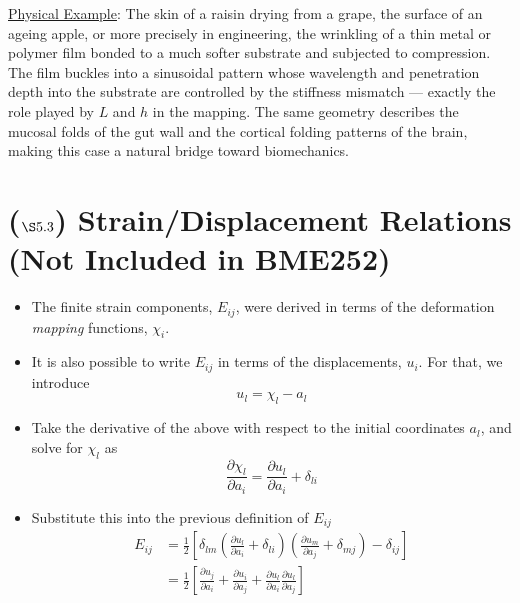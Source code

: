 \documentclass[11pt]{article}
\begin{document}
\uline{Physical Example}: The skin of a raisin drying from a grape, the surface of an ageing apple, or more precisely in engineering, the wrinkling of a thin metal or polymer film bonded to a much softer substrate and subjected to compression. The film buckles into a sinusoidal pattern whose wavelength and penetration depth into the substrate are controlled by the stiffness mismatch — exactly the role played by \(L\) and \(h\) in the mapping. The same geometry describes the mucosal folds of the gut wall and the cortical folding patterns of the brain, making this case a natural bridge toward biomechanics.
\section*{(\(\S5.3\)) Strain/Displacement Relations (Not Included in BME252)}
\label{sec:org86b48c2}
\begin{itemize}
\item The finite strain components, \(E_{ij}\), were derived in terms of the deformation \emph{mapping} functions, \(\chi_i\).
\end{itemize}
\begin{itemize}
\item It is also possible to write \(E_{ij}\) in terms of the displacements, \(u_i\). For that, we introduce
$$ u_l = \chi_l - a_l $$
\item Take the derivative of the above with respect to the initial coordinates \(a_l\), and solve for \(\chi_l\) as
$$ \frac{\partial \chi_l}{\partial a_i} = \frac{\partial u_l}{\partial a_i} + \delta_{li} $$
\item Substitute this into the previous definition of \(E_{ij}\)
\begin{align}
E_{ij} & = \frac{1}{2} \left[ \delta_{lm} \left( \frac{\partial u_l}{\partial a_i} + \delta_{li} \right) \left( \frac{\partial u_m}{\partial a_j} + \delta_{mj} \right) - \delta_{ij} \right] \\
       & = \frac{1}{2} \left[ \frac{\partial u_j}{\partial a_i} + \frac{\partial u_i}{\partial a_j} + \frac{\partial u_l}{\partial a_i} \frac{\partial u_l}{\partial a_j} \right]
\end{align}
\end{itemize}
\end{document}
